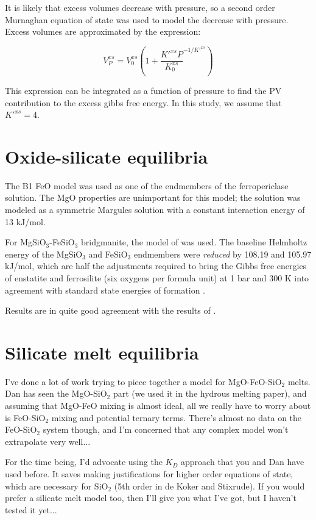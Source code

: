 \documentclass[11pt,a4paper,english]{article}
\begin{document}
It is likely that excess volumes decrease with pressure, so a second order Murnaghan equation of state was used to model the decrease with pressure. Excess volumes are approximated by the expression:

\begin{equation}
  V_P^{xs} = V_0^{xs} \left(1 + \frac{K'^{xs}P}{K_0^{xs}}^{-1/K'^{xs}} \right)
\end{equation}

This expression can be integrated as a function of pressure to find the PV contribution to the excess gibbs free energy. In this study, we assume that $K'^{xs}=4$.


\section{Oxide-silicate equilibria}
The B1 FeO model was used as one of the endmembers of the ferropericlase solution. The MgO properties are unimportant for this model; the solution was modeled as a symmetric Margules solution with a constant interaction energy of 13 kJ/mol.

For MgSiO$_3$-FeSiO$_3$ bridgmanite, the model of \cite{SLB2011} was used. The baseline Helmholtz energy of the MgSiO$_3$ and FeSiO$_3$ endmembers were \emph{reduced} by 108.19 and 105.97 kJ/mol, which are half the adjustments required to bring the Gibbs free energies of enstatite and ferrosilite (six oxygens per formula unit) at 1 bar and 300 K into agreement with standard state energies of formation \citep[as estimated by][]{HP2011}.


Results are in quite good agreement with the results of \citep{OHMBSO2008, OHMBSO2009}.


\section{Silicate melt equilibria}
I've done a lot of work trying to piece together a model for MgO-FeO-SiO$_2$ melts. Dan has seen the MgO-SiO$_2$ part (we used it in the hydrous melting paper), and assuming that MgO-FeO mixing is almost ideal, all we really have to worry about is FeO-SiO$_2$ mixing and potential ternary terms. There's almost no data on the FeO-SiO$_2$ system though, and I'm concerned that any complex model won't extrapolate very well...

For the time being, I'd advocate using the $K_D$ approach that you and Dan have used before. It saves making justifications for higher order equations of state, which are necessary for SiO$_2$ (5th order in de Koker and Stixrude). If you would prefer a silicate melt model too, then I'll give you what I've got, but I haven't tested it yet...
\end{document}
